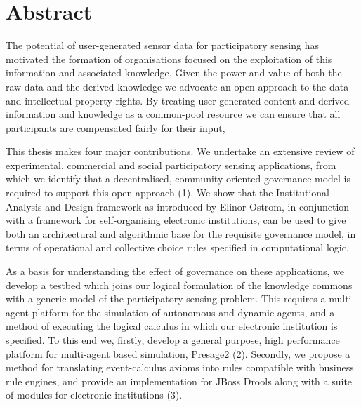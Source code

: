 \begingroup
\let\clearpage\relax
\let\cleardoublepage\relax
\let\cleardoublepage\relax

\chapter*{Abstract}

The potential of user-generated sensor data for participatory sensing has motivated the formation of organisations focused on the exploitation of this information and associated knowledge. 
Given the power and value of both the raw data and the derived knowledge we advocate an open approach to the data and intellectual
property rights. By treating user-generated content and derived information and knowledge 
as a common-pool resource we can ensure that
all participants are compensated fairly for their input,

This thesis makes four major contributions. We undertake an extensive review of experimental, commercial and social participatory sensing applications, from which we identify that a decentralised, community-oriented governance model is required
to support this open approach (1). We show that the Institutional Analysis and Design framework as introduced by Elinor Ostrom, in conjunction
with a framework for self-organising electronic institutions, can be used to give both an architectural
and algorithmic base for the requisite governance model, in terms of operational and collective choice rules
specified in computational logic.

As a basis for understanding the effect of governance on these applications, we develop a testbed which joins our logical formulation of the knowledge commons with a generic model of the participatory sensing problem.
This requires a multi-agent platform for the simulation of autonomous and dynamic agents, and a method of executing the logical calculus in which our electronic institution is specified. 
To this end we, firstly, develop a general purpose, high performance platform for multi-agent based simulation, Presage2 (2). 
Secondly, we propose a method for translating event-calculus axioms into rules compatible with business rule engines, and provide an implementation for JBoss Drools along with a suite of modules for electronic institutions (3).

